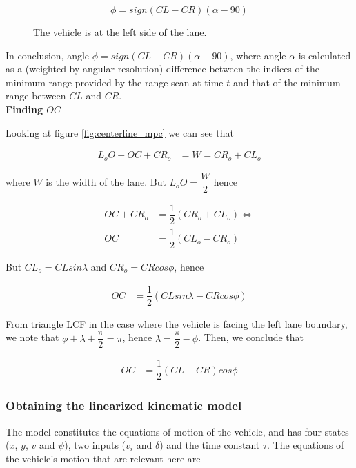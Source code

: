 $$\phi = sign(CL-CR)(\alpha - 90)$$

\begin{figure}[H]\centering
  \scalebox{1}{}
  \caption{The vehicle is at the left side of the lane.}
  \label{fig:circular_mpc_rotation_car_at_left_side}
\end{figure}


In conclusion, angle $\phi = sign(CL-CR) (\alpha-90)$, where angle $\alpha$
is calculated as a (weighted by angular resolution) difference between the
indices of the minimum range provided by the range scan at time $t$ and that
of the minimum range between $CL$ and $CR$. \\


\textbf{Finding $OC$}

Looking at figure \ref{fig:centerline_mpc} we can see that

\begin{align}
  L_o O + OC + CR_o &= W = CR_o + CL_o
\end{align}

where $W$ is the width of the lane. But $L_o O = \dfrac{W}{2}$ hence

\begin{align}
  OC + CR_o &= \dfrac{1}{2}(CR_o + CL_o) \Leftrightarrow \\
  OC &= \dfrac{1}{2}(CL_o - CR_o)
\end{align}

But $CL_o = CL sin\lambda$ and $CR_o = CR cos\phi$, hence


\begin{align}
  OC &= \dfrac{1}{2}(CL sin\lambda - CR cos\phi)
\end{align}

From triangle LCF in the case where the vehicle is facing the left lane boundary,
we note that $\phi + \lambda + \dfrac{\pi}{2} = \pi$,
hence $\lambda = \dfrac{\pi}{2} - \phi$. Then, we conclude that

\begin{align}
  OC &= \dfrac{1}{2}(CL - CR) cos\phi
\end{align}




\subsubsection{Obtaining the linearized kinematic model}

The model constitutes the equations of motion of the vehicle, and has four
states ($x$, $y$, $v$ and $\psi$), two inputs ($v_i$ and $\delta$) and the
time constant $\tau$. The equations of the vehicle's motion that are relevant here are

